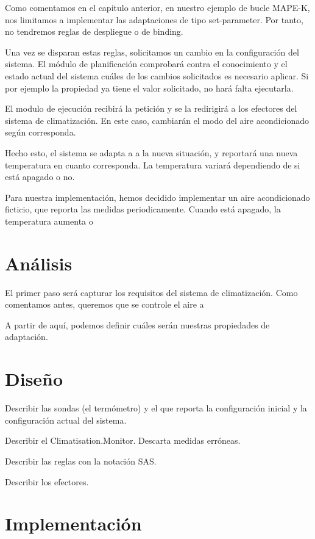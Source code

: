 Como comentamos en el capitulo anterior, en nuestro ejemplo de bucle MAPE-K, nos limitamos a implementar las adaptaciones de tipo set-parameter. Por tanto, no tendremos reglas de despliegue o de binding.

Una vez se disparan estas reglas, solicitamos un cambio en la configuración del sistema. El módulo de planificación comprobará contra el conocimiento y el estado actual del sistema cuáles de los cambios solicitados es necesario aplicar. Si por ejemplo la propiedad ya tiene el valor solicitado, no hará falta ejecutarla.

El modulo de ejecución recibirá la petición y se la redirigirá a los efectores del sistema de climatización. En este caso, cambiarán el modo del aire acondicionado según corresponda.

Hecho esto, el sistema se adapta a a la nueva situación, y reportará una nueva temperatura en cuanto corresponda. La temperatura variará dependiendo de si está apagado o no.

Para nuestra implementación, hemos decidido implementar un aire acondicionado ficticio, que reporta las medidas periodicamente. Cuando está apagado, la temperatura aumenta o

\section{Análisis}

El primer paso será capturar los requisitos del sistema de climatización. Como comentamos antes, queremos que se controle el aire a

A partir de aquí, podemos definir cuáles serán nuestras propiedades de adaptación.

\section{Diseño}

Describir las sondas (el termómetro) y el que reporta la configuración inicial y la configuración actual del sistema.

Describir el Climatisation.Monitor. Descarta medidas erróneas.

Describir las reglas con la notación SAS.

Describir los efectores.

\section{Implementación}

